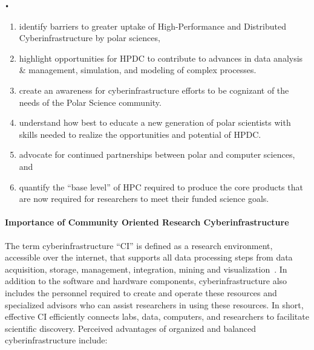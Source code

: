 \texttt{•}\documentclass[10pt,letterpaper,draft]{article}
\begin{document}
 
\begin{enumerate}[label=\roman*., itemsep=0pt, topsep=0pt]

\item identify barriers to greater uptake of High-Performance and Distributed Cyberinfrastructure by polar sciences,

\item highlight opportunities for HPDC to contribute to advances in data analysis \& management, simulation, and modeling of complex processes.

\item create an awareness for cyberinfrastructure efforts to be cognizant of the needs of the Polar Science community.

\item understand how best to educate a new generation of polar scientists with skills needed to realize the opportunities and potential of HPDC.

\item advocate for continued partnerships between polar and computer sciences, and

\item quantify the ``base level'' of HPC required to produce the core products that are now required for researchers to meet their funded science goals.

\end{enumerate}

\paragraph{Importance of Community Oriented Research Cyberinfrastructure}
The term cyberinfrastructure ``CI'' is defined as a research environment,
accessible over the internet, that supports all data processing steps from
data acquisition, storage, management, integration, mining and
visualization~\cite{HackHolyoke_2016}. In addition to the software and
hardware components, cyberinfrastructure also includes the personnel required
to create and operate these resources and specialized advisors who can assist
researchers in using these resources. In short, effective CI efficiently
connects labs, data, computers, and researchers to facilitate scientific
discovery. Perceived advantages of organized and balanced cyberinfrastructure
include:
\end{document}
